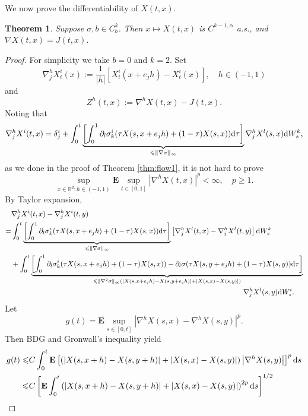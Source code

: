 \documentclass[twoside, 12pt]{book}
\numberwithin{equation}{chapter}
\newtheorem{theorem}{Theorem}[section]
\def\mR{{\mathbb R}}
\def\bE{{\mathbf E}}
\def\l{\left}
\def\r{\right}
\def\geq{\geqslant}
\def\leq{\leqslant}
\def\d{\text{\rm{d}}}
\begin{document}
We now prove the differentiability of $X(t,x)$. 
\begin{theorem}
    Suppose  $\sigma,b\in C^k_b$. Then $x\mapsto X(t,x)$ is $C^{k-1,\alpha}$ a.s., and $\nabla X(t,x)=J(t,x)$. 
\end{theorem}
\begin{proof}
    For simplicity we take $b=0$ and $k=2$. 
    Set 
    \[
    \nabla_{j}^{h}X^i_t(x):=\frac{1}{|h|} \l[X_t^i(x+e_jh)-X_t^i(x)\r], \quad h\in (-1,1)
    \]
    and 
    \[
    Z^h(t,x):=\nabla^{h}X(t,x)-J(t,x). 
    \]
    Noting that 
    \[
    \nabla^{h}_{j}X^i(t,x)=\delta^i_j+\int_0^t \underbrace{\left[\int_0^1 \partial_l\sigma^i_k(\tau X(s,x+e_j h)+(1-\tau)X(s,x)) \d \tau\right]}_{\leq \|\nabla \sigma\|_\infty} \nabla^{h}_j X^l(s,x) \d W^k_s, 
    \]
   as we done in the proof of Theorem \ref{thm:flow1}, it is not hard to prove 
    \begin{equation}\label{eq:difx-X}
        \sup_{x\in \mR^d; h\in (-1,1)}\bE \sup_{t\in[0,1]}|\nabla^{h}X(t,x)|^p<\infty, \quad p\geq 1. 
    \end{equation}
   By Taylor expansion, 
   \begin{equation*}
       \begin{aligned}
           &\nabla^{h}_jX^i(t,x)-\nabla^{h}_jX^i(t,y)\\
           =&\int_0^t \underbrace{\left[\int_0^1 \partial_l\sigma^i_k(\tau X(s,x+e_j h)+(1-\tau)X(s,x)) \d \tau\right]}_{\leq \|\nabla\sigma\|_\infty} \l[\nabla^{h}_jX^l(t,x)-\nabla^{h}_jX^l(t,y)\r] \d W^k_s\\
           &+\int_0^t \underbrace{\left[\int_0^1 \partial_l\sigma^i_k(\tau X(s,x+e_jh)+(1-\tau)X(s,x))-\partial_l\sigma(\tau X(s,y+e_jh)+(1-\tau)X(s,y)) \d \tau\right]}_{\leq \|\nabla^2\sigma\|_\infty(|X(s,x+e_jh)-X(s,y+e_jh)|+|X(s,x)-X(s,y)|)} \\
           &\qquad\qquad\qquad \qquad \qquad\qquad\qquad \qquad \qquad\qquad\qquad \qquad \qquad\qquad\qquad \qquad \nabla^{h}_jX^l(s,y) \d W^i_s. 
       \end{aligned}
   \end{equation*}
   Let 
   \[
   g(t)=\bE \sup_{s\in[0,t]}|\nabla^{h}X(s,x)-\nabla^{h}X(s,y)|^p.
   \]
   Then BDG and Gronwall's inequality yield 
   \[
   \begin{aligned}
       g(t)\leq& C \int_0^t \bE \left[\left(|X(s,x+h)-X(s,y+h)|+|X(s,x)-X(s,y)|\right)\l|\nabla^{h}X(s,y)\r|\right]^p \d s\\
       \leq& C\left[ \bE \int_0^t \left(\l|X(s,x+h)-X(s,y+h)|+|X(s,x)-X(s,y)\r|\right)^{2p}\d s \right]^{1/2} \\

\end{aligned}\]
\end{proof}
\end{document}
